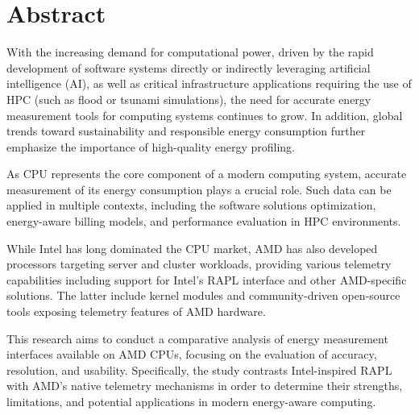 \section*{Abstract}

With the increasing demand for computational power, driven by the rapid
development of software systems directly or indirectly leveraging
artificial intelligence (AI), as well as critical infrastructure applications
requiring the use of \gls{HPC} (such as flood or tsunami simulations), the
need for accurate energy measurement tools for computing systems continues to
grow. In addition, global trends toward sustainability and responsible energy
consumption further emphasize the importance of high-quality energy profiling.

As \gls{CPU} represents the core component of a modern computing system,
accurate measurement of its energy consumption plays a crucial role.
Such data can be applied in multiple contexts, including the software
solutions optimization, energy-aware billing models, and performance
evaluation in \gls{HPC} environments.

While Intel has long dominated the \gls{CPU} market, AMD has also developed
processors targeting server and cluster workloads, providing various telemetry
capabilities including support for Intel’s \gls{RAPL} interface and other
AMD-specific solutions. The latter include kernel modules and community-driven
open-source tools exposing telemetry features of AMD hardware.

This research aims to conduct a comparative analysis of energy measurement
interfaces available on AMD \gls{CPU}s, focusing on the evaluation of accuracy,
resolution, and usability. Specifically, the study contrasts Intel-inspired
\gls{RAPL} with AMD’s native telemetry mechanisms in order to determine their
strengths, limitations, and potential applications in modern energy-aware
computing.


